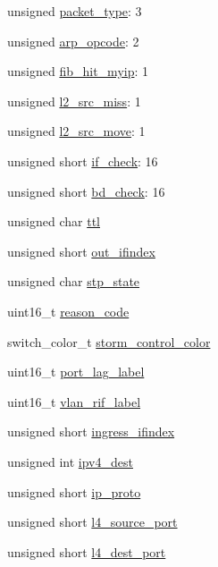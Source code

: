 \begin{DoxyCompactItemize}
\item 
unsigned \hyperlink{unionswitch__acl__system__value___ac36d5abaa19cb2447603ae92cd2a07e8}{packet\+\_\+type}\+: 3
\item 
unsigned \hyperlink{unionswitch__acl__system__value___a9e796157f85034779bc18f47a2d437fc}{arp\+\_\+opcode}\+: 2
\item 
unsigned \hyperlink{unionswitch__acl__system__value___abc84b81051d04b5b3fbf879ed1d760a0}{fib\+\_\+hit\+\_\+myip}\+: 1
\item 
unsigned \hyperlink{unionswitch__acl__system__value___a6d3dcee009c534ca53389e463ae3b185}{l2\+\_\+src\+\_\+miss}\+: 1
\item 
unsigned \hyperlink{unionswitch__acl__system__value___a88f748b06b39804a8c49d3808b1a5b75}{l2\+\_\+src\+\_\+move}\+: 1
\item 
unsigned short \hyperlink{unionswitch__acl__system__value___aec4cf30c26cb6e5bf1b416316a2528b6}{if\+\_\+check}\+: 16
\item 
unsigned short \hyperlink{unionswitch__acl__system__value___ad8e104c41ada3e506f4e29809dda2129}{bd\+\_\+check}\+: 16
\item 
unsigned char \hyperlink{unionswitch__acl__system__value___a0f7d16f149a8cef677d399b642c1b0b6}{ttl}
\item 
unsigned short \hyperlink{unionswitch__acl__system__value___a7dbba03ec54f1df15e9db1e033214200}{out\+\_\+ifindex}
\item 
unsigned char \hyperlink{unionswitch__acl__system__value___ab1150c9b21d759f7aa7e7fa1b6527fb4}{stp\+\_\+state}
\item 
uint16\+\_\+t \hyperlink{unionswitch__acl__system__value___aa8c2b01986a2e4e28c6faa96048f2b34}{reason\+\_\+code}
\item 
switch\+\_\+color\+\_\+t \hyperlink{unionswitch__acl__system__value___aed370c58db7e6f08487e2bb892f9c0d7}{storm\+\_\+control\+\_\+color}
\item 
uint16\+\_\+t \hyperlink{unionswitch__acl__system__value___addd6be759930b848b397470f043835bf}{port\+\_\+lag\+\_\+label}
\item 
uint16\+\_\+t \hyperlink{unionswitch__acl__system__value___aa416a9dd92007e86b114179391f01548}{vlan\+\_\+rif\+\_\+label}
\item 
unsigned short \hyperlink{unionswitch__acl__system__value___a88e9e80b03fdde4c4d8b2a4712319bf1}{ingress\+\_\+ifindex}
\item 
unsigned int \hyperlink{unionswitch__acl__system__value___af276bc0bb80a2bb10f5e6d55a8f064a8}{ipv4\+\_\+dest}
\item 
unsigned short \hyperlink{unionswitch__acl__system__value___a665249b78eda52f2952a01a3f6be3a84}{ip\+\_\+proto}
\item 
unsigned short \hyperlink{unionswitch__acl__system__value___a8d1651ff9a8c302fc6831feac08ba073}{l4\+\_\+source\+\_\+port}
\item 
unsigned short \hyperlink{unionswitch__acl__system__value___a947ec1ce11e89701598278b71635ad3f}{l4\+\_\+dest\+\_\+port}
\end{DoxyCompactItemize}


